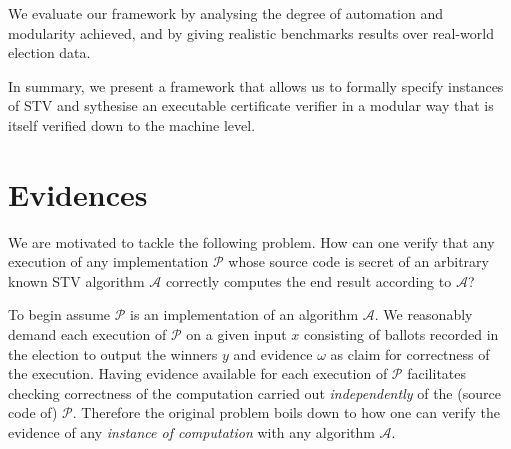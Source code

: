 \documentclass[10pt,conference]{IEEEtran}
\begin{document}

We evaluate our framework by analysing the degree of automation and modularity achieved, and by giving realistic benchmarks results over real-world election data.

In summary, we present a framework that allows us to formally specify instances of STV and sythesise an executable certificate verifier in a modular way that is itself verified down to the machine level.
\section{Evidences}
\label{sec:DataEv}
  
We are motivated to 
tackle the following problem. How can one verify that any execution of any implementation $\mathcal{P}$ whose source code is secret of an arbitrary  known STV algorithm $\mathcal{A}$ correctly computes the end result according to  $\mathcal{A}$?  



To begin 
assume $\mathcal{P}$ is an implementation of an algorithm $\mathcal{A}$. We reasonably demand each execution of $\mathcal{P}$ on a given input $x$ consisting of ballots recorded in the election to output the winners $y$ and evidence $\omega$ as claim  for correctness of the execution.  
 Having evidence available for each execution of $\mathcal{P}$ facilitates checking correctness of the computation carried out \emph{independently} of the (source code of) $\mathcal{P}$. Therefore the original problem boils down to how one can verify the evidence of any \emph{instance of computation} with any algorithm $\mathcal{A}$.
\end{document}
